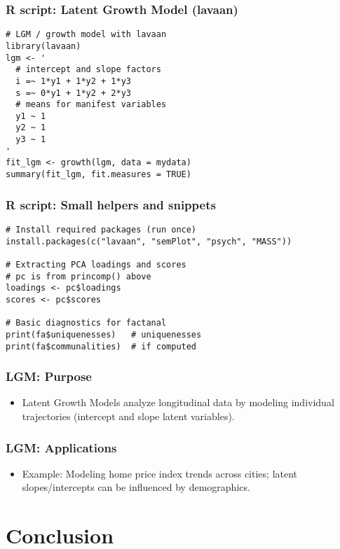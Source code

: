 \documentclass{beamer}
\begin{document}
\begin{frame}[fragile]
    \frametitle{R script: Latent Growth Model (lavaan)}
    \begin{verbatim}
# LGM / growth model with lavaan
library(lavaan)
lgm <- '
  # intercept and slope factors
  i =~ 1*y1 + 1*y2 + 1*y3
  s =~ 0*y1 + 1*y2 + 2*y3
  # means for manifest variables
  y1 ~ 1
  y2 ~ 1
  y3 ~ 1
'
fit_lgm <- growth(lgm, data = mydata)
summary(fit_lgm, fit.measures = TRUE)
    \end{verbatim}
\end{frame}

\begin{frame}[fragile]
    \frametitle{R script: Small helpers and snippets}
    \begin{verbatim}
# Install required packages (run once)
install.packages(c("lavaan", "semPlot", "psych", "MASS"))

# Extracting PCA loadings and scores
# pc is from princomp() above
loadings <- pc$loadings
scores <- pc$scores

# Basic diagnostics for factanal
print(fa$uniquenesses)   # uniquenesses
print(fa$communalities)  # if computed
    \end{verbatim}
\end{frame}

\begin{frame}
    \frametitle{LGM: Purpose}
    \begin{itemize}
        \item Latent Growth Models analyze longitudinal data by modeling individual trajectories (intercept and slope latent variables).
    \end{itemize}
\end{frame}

\begin{frame}
    \frametitle{LGM: Applications}
    \begin{itemize}
        \item Example: Modeling home price index trends across cities; latent slopes/intercepts can be influenced by demographics.
    \end{itemize}
\end{frame}

\section{Conclusion}
\end{document}

